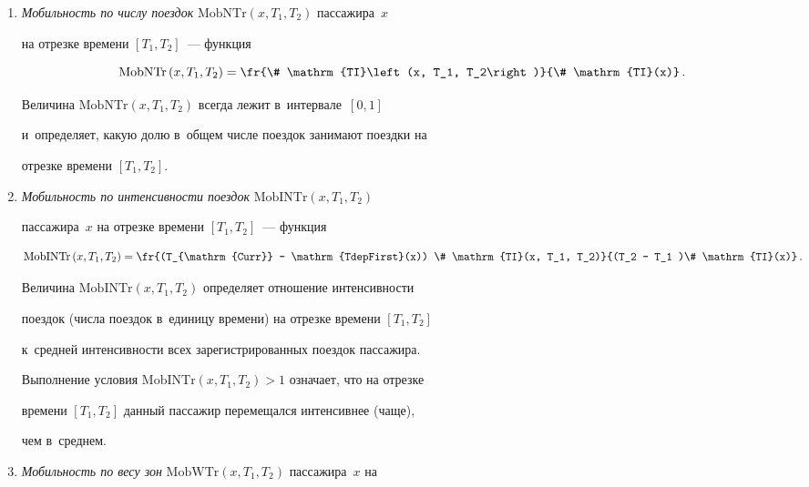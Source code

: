 \begin{enumerate}[1.]


\item \textit{Мобильность по чис\-лу поездок} $\mathrm{MobNTr}(x, T_1, T_2)$ пассажира~$x$ 


на отрезке времени $[T_1, T_2]$~--- функция


$$


\mathrm{MobNTr}\left(x, T_1, T_2\right) = \fr{\# \mathrm{TI}\left(x, T_1, T_2\right)}{\# \mathrm{TI}(x)}\,.


$$





Величина $\mathrm{MobNTr}(x, T_1, T_2)$ всегда лежит в~интервале~$[0, 1]$ 


и~определяет, какую долю в~общем чис\-ле поездок занимают поездки на 


отрезке времени $[T_1, T_2]$.


\item


\textit{Мобильность по интенсивности поездок} $\mathrm{MobINTr}(x, T_1, T_2)$ 


пассажира~$x$ на отрезке времени $[T_1, T_2]$~--- функция


$$


\mathrm{MobINTr}\left(x, T_1, T_2\right) =


\fr{(T_{\mathrm{Curr}} - \mathrm{TdepFirst}(x)) \# \mathrm{TI}(x, T_1, T_2)}


{(T_2 - T_1 )\# \mathrm{TI}(x)}\,.


$$





Величина $\mathrm{MobINTr}(x, T_1, T_2)$ определяет отношение интенсивности 


поездок (числа поездок в~единицу времени) на отрезке времени $[T_1, T_2]$ 


к~средней ин\-тен\-сив\-ности всех зарегистрированных поездок пассажира. 


Выполнение условия $\mathrm{MobINTr}(x, T_1, T_2)>1$ означает, что на отрезке 


времени $[T_1, T_2]$ данный пассажир перемещался интенсивнее (чаще), 


чем в~сред\-нем.


\item


\textit{Мобильность по весу зон} $\mathrm{MobWTr}(x, T_1, T_2)$ пассажира~$x$ на 



\end{enumerate}

